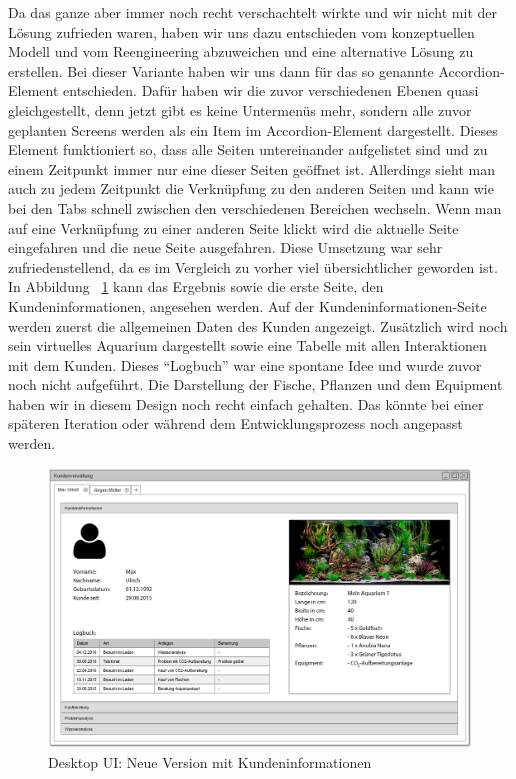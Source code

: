 Da das ganze aber immer noch recht verschachtelt wirkte und wir nicht mit der Lösung zufrieden waren, haben wir uns dazu entschieden vom konzeptuellen Modell und vom Reengineering abzuweichen und eine alternative Lösung zu erstellen. Bei dieser Variante haben wir uns dann für das so genannte Accordion-Element entschieden. Dafür haben wir die zuvor verschiedenen Ebenen quasi gleichgestellt, denn jetzt gibt es keine Untermenüs mehr, sondern alle zuvor geplanten Screens werden als ein Item im Accordion-Element dargestellt. Dieses Element funktioniert so, dass alle Seiten untereinander aufgelistet sind und zu einem Zeitpunkt immer nur eine dieser Seiten geöffnet ist. Allerdings sieht man auch zu jedem Zeitpunkt die Verknüpfung zu den anderen Seiten und kann wie bei den Tabs schnell zwischen den verschiedenen Bereichen wechseln. Wenn man auf eine Verknüpfung zu einer anderen Seite klickt wird die aktuelle Seite eingefahren und die neue Seite ausgefahren. Diese Umsetzung war sehr zufriedenstellend, da es im Vergleich zu vorher viel übersichtlicher geworden ist. In Abbildung ~\ref{desktopUI:2} kann das Ergebnis sowie die erste Seite, den Kundeninformationen, angesehen werden. Auf der Kundeninformationen-Seite werden zuerst die allgemeinen Daten des Kunden angezeigt. Zusätzlich wird noch sein virtuelles Aquarium dargestellt sowie eine Tabelle mit allen Interaktionen mit dem Kunden. Dieses ``Logbuch'' war eine spontane Idee und wurde zuvor noch nicht aufgeführt. Die Darstellung der Fische, Pflanzen und dem Equipment haben wir in diesem Design noch recht einfach gehalten. Das könnte bei einer späteren Iteration oder während dem Entwicklungsprozess noch angepasst werden.

\begin{figure}[ht!]
\centering
\includegraphics[width=\linewidth]{2Kundeninformation}
\caption{Desktop UI: Neue Version mit Kundeninformationen}
\label{desktopUI:2}
\end{figure}

